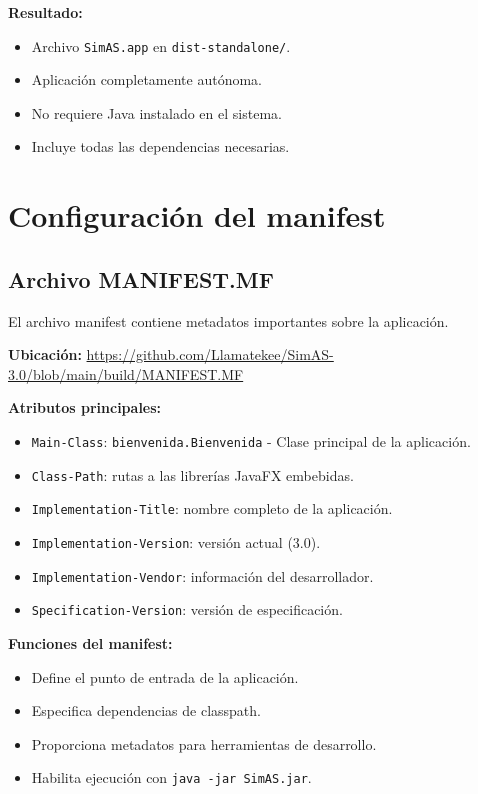 \textbf{Resultado:}
\begin{itemize}
    \item Archivo \texttt{SimAS.app} en \texttt{dist-standalone/}.
    \item Aplicación completamente autónoma.
    \item No requiere Java instalado en el sistema.
    \item Incluye todas las dependencias necesarias.
\end{itemize}

\section{Configuración del manifest}

\subsection{Archivo MANIFEST.MF}

El archivo manifest contiene metadatos importantes sobre la aplicación.

\textbf{Ubicación:} \url{https://github.com/Llamatekee/SimAS-3.0/blob/main/build/MANIFEST.MF}

\textbf{Atributos principales:}

\begin{itemize}
    \item \texttt{Main-Class}: \texttt{bienvenida.Bienvenida} - Clase principal de la aplicación.
    \item \texttt{Class-Path}: rutas a las librerías JavaFX embebidas.
    \item \texttt{Implementation-Title}: nombre completo de la aplicación.
    \item \texttt{Implementation-Version}: versión actual (3.0).
    \item \texttt{Implementation-Vendor}: información del desarrollador.
    \item \texttt{Specification-Version}: versión de especificación.
\end{itemize}

\textbf{Funciones del manifest:}
\begin{itemize}
    \item Define el punto de entrada de la aplicación.
    \item Especifica dependencias de classpath.
    \item Proporciona metadatos para herramientas de desarrollo.
    \item Habilita ejecución con \texttt{java -jar SimAS.jar}.
\end{itemize}

